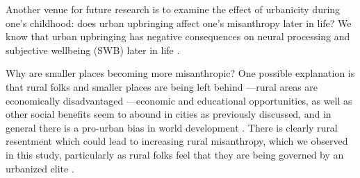\documentclass[11pt, letterpaper]{article}
\begin{document}
\begin{spacing}{1.4}
Another venue for future research is to examine the effect of urbanicity during one's childhood: does urban upbringing affect one's misanthropy later in life? We know that urban upbringing has negative consequences on neural processing and subjective wellbeing (SWB) later in life \citep{lederbogen11,aok20}. 

Why are smaller places becoming more misanthropic? One possible explanation is that rural folks and smaller places are being left behind \citep{fullerNYT17monD,hansonCityJournalautumn15,aok-misanthropy-trustCity,aok-swbGenYcity18,aokCityBook15}---rural areas are economically disadvantaged \citep{glaeser11,osullivan09,florida21}---economic and educational opportunities, as well as other social benefits seem to abound in cities as previously discussed, and in general there is a pro-urban bias in world development \citep{lipton77}. There is clearly rural resentment which could lead to increasing rural misanthropy, which we observed in this study, 
  particularly as rural folks feel that they are being governed by an urbanized elite \citep{wuthnow18,fullerNYT17monD}. %


\end{spacing}
\end{document}
